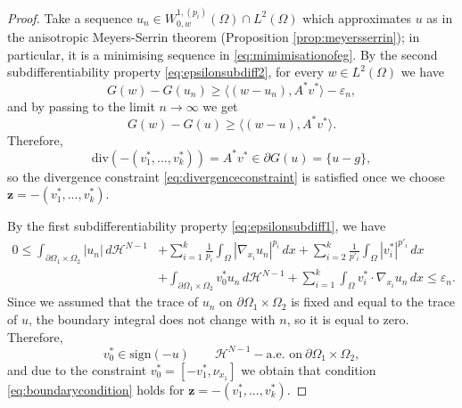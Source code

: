 \documentclass[reqno,12pt]{amsart}
\numberwithin{equation}{section}
\begin{document}
\begin{proof}
Take a sequence $u_n \in W_{0,w}^{1,(p_i)}(\Omega) \cap L^2(\Omega)$ which approximates $u$ as in the anisotropic Meyers-Serrin theorem (Proposition \ref{prop:meyersserrin}); in particular, it is a minimising sequence in \eqref{eq:mimimisationofeg}. By the second subdifferentiability property \eqref{eq:epsilonsubdiff2}, for every $w \in L^2(\Omega)$ we have
$$G(w) - G(u_n) \geq \langle (w -u_n), A^* v^* \rangle  -\varepsilon_n,$$
and by passing to the limit $n \rightarrow \infty$ we get
$$G(w) - G(u) \geq \langle (w -u), A^* v^* \rangle.$$
Therefore,
$$ \mathrm{div}(-(v_1^*,...,v_k^*)) = A^* v^* \in \partial G(u) = \{ u - g \}, $$
so the divergence constraint \eqref{eq:divergenceconstraint} is satisfied once we choose $\mathbf{z} = - (v_1^*,...,v_k^*)$.

By the first subdifferentiability property \eqref{eq:epsilonsubdiff1}, we have
\begin{align}
0 \leq \int_{\partial\Omega_1 \times \Omega_2} |u_n| \, d\mathcal{H}^{N-1} &+ \sum_{i=1}^k \frac{1}{p_i} \int_\Omega |\nabla_{x_i} u_n|^{p_i} \, dx + \sum_{i=2}^k \frac{1}{p'_i} \int_\Omega |v_i^*|^{p'_i} \, dx \\
&+ \int_{\partial\Omega_1 \times \Omega_2} v_0^* u_n \, d\mathcal{H}^{N-1} + \sum_{i=1}^k \int_\Omega v_i^* \cdot \nabla_{x_i} u_n \, dx  \leq \varepsilon_n.
\end{align}
Since we assumed that the trace of $u_n$ on $\partial\Omega_1 \times \Omega_2$ is fixed and equal to the trace of $u$, the boundary integral does not change with $n$, so it is equal to zero. Therefore,
\begin{equation}
v_0^* \in \mathrm{sign}(-u) \qquad  \mathcal{H}^{N-1}-\mbox{a.e.  on} \ \partial \Omega_1 \times \Omega_2,
\end{equation}
and due to the constraint $v_0^* = [-v_1^*, \nu_{x_1}]$ we obtain that condition \eqref{eq:boundarycondition} holds for $\mathbf{z} = -(v_1^*,...,v_k^*)$.


\end{proof}
\end{document}
